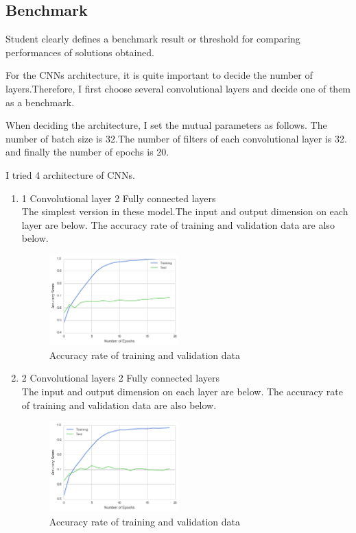 \documentclass[a4paper,10pt,fleqn]{article}
\begin{document}
\subsection{Benchmark}
Student clearly defines a benchmark result or threshold for comparing performances of solutions obtained.

For the CNNs architecture, it is quite important to decide the number of layers.Therefore, I first choose several convolutional layers and decide one of them as a benchmark.

When deciding the architecture, I set the mutual parameters as follows.
The number of batch size is 32.The number of filters of each convolutional layer is 32. and finally the number of epochs is 20.

I tried 4 architecture of CNNs.

\begin{enumerate}
 \item 1 Convolutional layer  2 Fully connected layers \\
 The simplest version in these model.The input and output dimension on each layer are below.
 The accuracy rate of training and validation data are also below.
 
 \begin{figure}[htbp]

	\begin{center}
	\includegraphics[width=5cm]{picture/1layer_cnn.png}
	\caption{Accuracy rate of training and validation data}
	\end{center}
	\label{fig:eight}

\end{figure}
 
 \item 2 Convolutional layers  2 Fully connected layers \\
 The input and output dimension on each layer are below.
 The accuracy rate of training and validation data are also below.
 
 \begin{figure}[htbp]

	\begin{center}
	\includegraphics[width=5cm]{picture/2layer_cnn.png}
	\caption{Accuracy rate of training and validation data}
	\end{center}
	\label{fig:nine}


\end{figure}
\end{enumerate}
\end{document}
